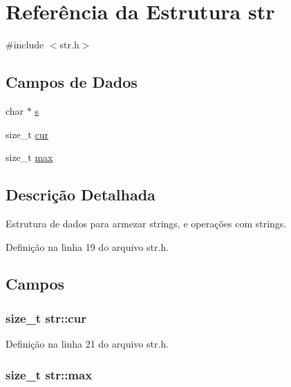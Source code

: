 \hypertarget{structstr}{
\section{Referência da Estrutura str}
\label{structstr}
}


{\ttfamily \#include $<$str.h$>$}

\subsection*{Campos de Dados}
\begin{DoxyCompactItemize}
\item 
char $\ast$ \hyperlink{structstr_a1fc4ce5d6a790001388349ca5b735383}{s}
\item 
size\_\-t \hyperlink{structstr_a047d84b55a2d3a9ef7fae84aec97fef2}{cur}
\item 
size\_\-t \hyperlink{structstr_ab653cd97c58cb798ab3e7e6c40e9f1df}{max}
\end{DoxyCompactItemize}


\subsection{Descrição Detalhada}
Estrutura de dados para armezar strings, e operações com strings. 

Definição na linha 19 do arquivo str.h.



\subsection{Campos}
\hypertarget{structstr_a047d84b55a2d3a9ef7fae84aec97fef2}{
\subsubsection[{cur}]{\setlength{\rightskip}{0pt plus 5cm}size\_\-t {\bf str::cur}}}
\label{structstr_a047d84b55a2d3a9ef7fae84aec97fef2}


Definição na linha 21 do arquivo str.h.

\hypertarget{structstr_ab653cd97c58cb798ab3e7e6c40e9f1df}{
\subsubsection[{max}]{\setlength{\rightskip}{0pt plus 5cm}size\_\-t {\bf str::max}}}
\label{structstr_ab653cd97c58cb798ab3e7e6c40e9f1df}


